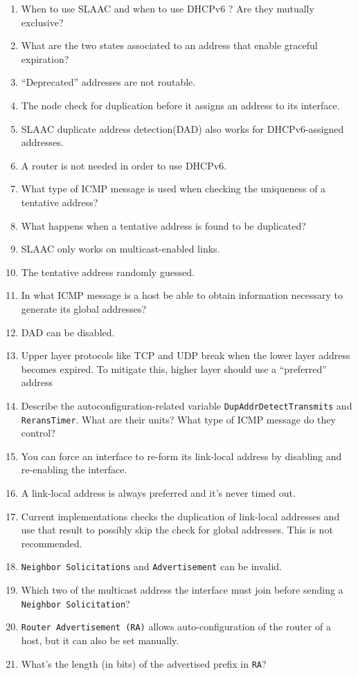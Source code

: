 \begin{enumerate}
\item When to use SLAAC and when to use DHCPv6 ? Are they mutually exclusive? \ans{}
\item What are the two states associated to an address that enable graceful
  expiration? \ans{}
\item ``Deprecated''  addresses are not routable. \tf{}
\item The node check for duplication before it assigns an address to its
  interface. \tf{}
\item SLAAC duplicate address detection(DAD) also works for DHCPv6-assigned
  addresses. \tf{}
\item A router is not needed in order to use DHCPv6. \tf{}
\item What type of ICMP message is used when checking the uniqueness of a tentative
  address? \ans{}
\item What happens when a tentative address is found to be duplicated? \ans{}
\item SLAAC only works on multicast-enabled links. \tf{}
\item The tentative address randomly guessed. \tf{}
\item In what ICMP message is a host be able to obtain information necessary to generate
  its global addresses? \ans{}
\item DAD can be disabled. \tf{}
\item Upper layer protocols like TCP and UDP break when the lower layer address
  becomes expired. To mitigate this, higher layer should use a ``preferred''
  address \tf{}
\item Describe the autoconfiguration-related variable
  \texttt{DupAddrDetectTransmits} and \texttt{ReransTimer}. What are their
  units? What type of ICMP message do they control? \ans{}
\item You can force an interface to re-form its link-local address by disabling
  and re-enabling the interface. \tf{}
\item A link-local address is always preferred and it's never timed out. \tf{}
\item Current implementations checks the duplication of link-local addresses and
  use that result to possibly skip the check for global addresses. This is not
  recommended. \tf{}
\item \texttt{Neighbor Solicitations} and \texttt{Advertisement} can be invalid. \tf{}
\item Which two of the multicast address the interface must join before sending
  a \texttt{Neighbor Solicitation}? \ans{}
\item \texttt{Router Advertisement (RA)} allows auto-configuration of the router
  of a host, but it can also be set manually. \tf{}
\item What's the length (in bits) of the advertised prefix in \texttt{RA}? \ans{} 
\end{enumerate}